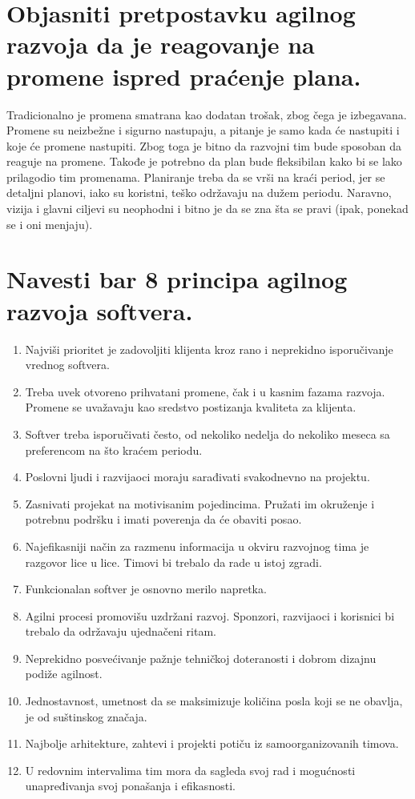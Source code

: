 \documentclass[a4paper]{article}
\begin{document}
\section{Objasniti pretpostavku agilnog razvoja da je reagovanje na promene ispred praćenje plana.}
  Tradicionalno je promena smatrana kao dodatan trošak, zbog čega je izbegavana. Promene su 
  neizbežne i sigurno nastupaju, a pitanje je samo kada će nastupiti i koje će promene nastupiti.
  Zbog toga je bitno da razvojni tim bude sposoban da reaguje na promene. Takođe je potrebno da plan
  bude fleksibilan kako bi se lako prilagodio tim promenama. Planiranje treba da se vrši na kraći
  period, jer se detaljni planovi, iako su koristni, teško održavaju na dužem periodu. Naravno,
  vizija i glavni ciljevi su neophodni i bitno je da se zna šta se pravi (ipak, 
  ponekad se i oni menjaju).

\section{Navesti bar 8 principa agilnog razvoja softvera.}
  \begin{enumerate}
    \item Najviši prioritet je zadovoljiti klijenta kroz rano i neprekidno isporučivanje vrednog 
          softvera.
    \item Treba uvek otvoreno prihvatani promene, čak i u kasnim fazama razvoja. Promene se uvažavaju 
          kao sredstvo postizanja kvaliteta za klijenta.
    \item Softver treba isporučivati često, od nekoliko nedelja do nekoliko meseca sa preferencom 
          na što kraćem periodu.
    \item Poslovni ljudi i razvijaoci moraju sarađivati svakodnevno na projektu.
    \item Zasnivati projekat na motivisanim pojedincima. Pružati im okruženje i potrebnu podršku
          i imati poverenja da će obaviti posao.
    \item Najefikasniji način za razmenu informacija u okviru razvojnog tima je razgovor
          lice u lice. Timovi bi trebalo da rade u istoj zgradi.
    \item Funkcionalan softver je osnovno merilo napretka.
    \item Agilni procesi promovišu uzdržani razvoj. Sponzori, razvijaoci i korisnici bi trebalo
          da održavaju ujednačeni ritam. 
    \item Neprekidno posvećivanje pažnje tehničkoj doteranosti i dobrom dizajnu podiže agilnost.  
    \item Jednostavnost, umetnost da se maksimizuje količina posla koji se ne obavlja, je od
          suštinskog značaja.
    \item Najbolje arhitekture, zahtevi i projekti potiču iz samoorganizovanih timova. 
    \item U redovnim intervalima tim mora da sagleda svoj rad i mogućnosti unapređivanja svoj ponašanja
          i efikasnosti. \cite{ss_agile_manifesto}
  \end{enumerate}
\end{document}
